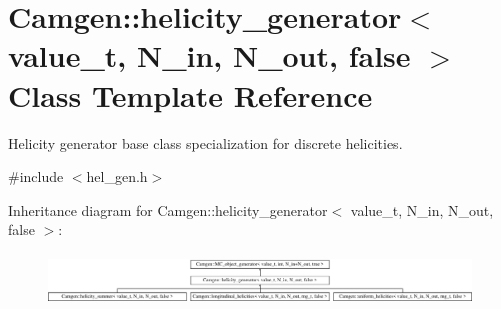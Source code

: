 \hypertarget{a00267}{\section{Camgen\-:\-:helicity\-\_\-generator$<$ value\-\_\-t, N\-\_\-in, N\-\_\-out, false $>$ Class Template Reference}
\label{a00267}
}


Helicity generator base class specialization for discrete helicities.  




{\ttfamily \#include $<$hel\-\_\-gen.\-h$>$}

Inheritance diagram for Camgen\-:\-:helicity\-\_\-generator$<$ value\-\_\-t, N\-\_\-in, N\-\_\-out, false $>$\-:\begin{figure}[H]
\begin{center}
\leavevmode
\includegraphics[height=1.372549cm]{a00267}
\end{center}
\end{figure}
